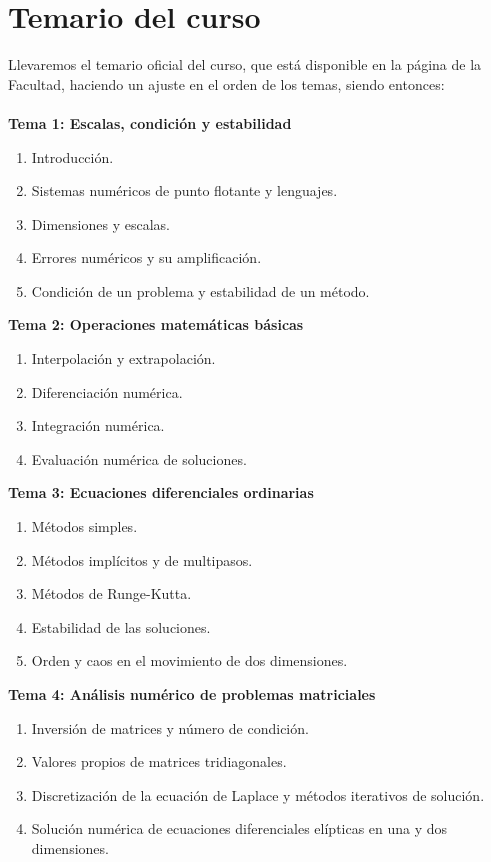 \documentclass[12pt]{article}
\begin{document}
\section{Temario del curso}
Llevaremos el temario oficial del curso, que está disponible en la página de la Facultad, haciendo un ajuste en el orden de los temas, siendo entonces:
\\
\\  
\textbf{Tema 1: Escalas, condición y estabilidad}
\begin{enumerate}
\item Introducción.
\item Sistemas numéricos de punto flotante y lenguajes.
\item Dimensiones y escalas.
\item Errores numéricos y su amplificación.
\item Condición de un problema y estabilidad de un método.
\end{enumerate}
\textbf{Tema 2: Operaciones matemáticas básicas}
\begin{enumerate}
\item Interpolación y extrapolación.
\item Diferenciación numérica.
\item Integración numérica.
\item Evaluación numérica de soluciones.
\end{enumerate}
\textbf{Tema 3: Ecuaciones diferenciales ordinarias}
\begin{enumerate}
\item Métodos simples.
\item Métodos implícitos y de multipasos.
\item Métodos de Runge-Kutta.
\item Estabilidad de las soluciones.
\item Orden y caos en el movimiento de dos dimensiones.
\end{enumerate}
\textbf{Tema 4: Análisis numérico de problemas matriciales}
\begin{enumerate}
\item Inversión de matrices y número de condición.
\item Valores propios de matrices tridiagonales.
\item Discretización de la ecuación de Laplace y métodos iterativos de solución.
\item Solución numérica de ecuaciones diferenciales elípticas en una y dos dimensiones.
\end{enumerate}
\end{document}

